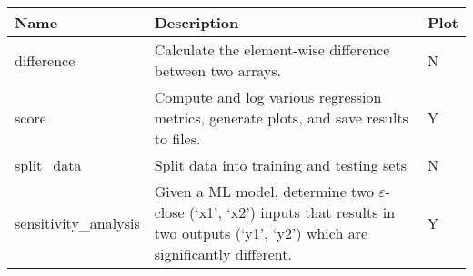 \begin{tabular}{lp{6cm}l}
	\toprule
	Name & Description & Plot \\
	\midrule
	difference & 
    Calculate the element-wise difference between two arrays. 
    & N \\
	score & 
    Compute and log various regression metrics, generate plots, and save results to files. 
    & Y \\
	split\_data & Split data into training and testing sets & N \\
	sensitivity\_analysis & Given a ML model, determine two $\varepsilon$-close  (`x1', `x2') inputs that results in two outputs (`y1', `y2') which are significantly different. & Y \\
	\bottomrule
\end{tabular}